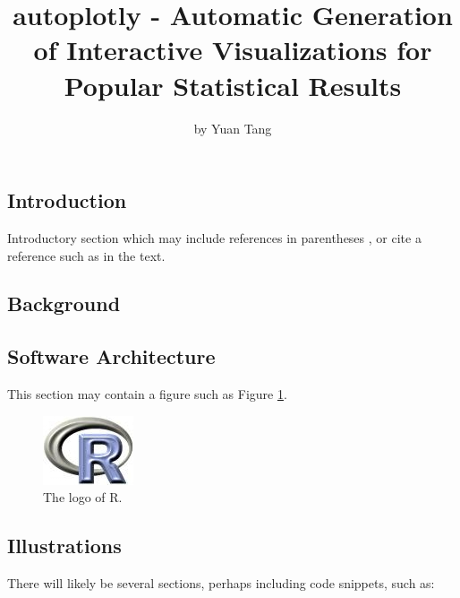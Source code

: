 \title{autoplotly - Automatic Generation of Interactive Visualizations for
Popular Statistical Results}
\author{by Yuan Tang}

\maketitle


\subsection{Introduction}\label{introduction}

Introductory section which may include references in parentheses
\citep{R}, or cite a reference such as \citet{R} in the text.

\subsection{Background}\label{background}

\subsection{Software Architecture}\label{software-architecture}

This section may contain a figure such as Figure \ref{figure:rlogo}.

\begin{figure}[htbp]
  \centering
  \includegraphics{Rlogo}
  \caption{The logo of R.}
  \label{figure:rlogo}
\end{figure}

\subsection{Illustrations}\label{illustrations}

There will likely be several sections, perhaps including code snippets,
such as:

